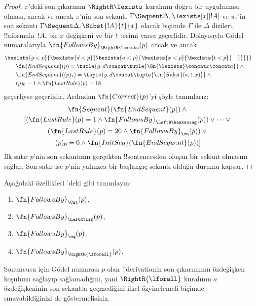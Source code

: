 \documentclass[../../../include/open-logic-section]{subfiles}
\begin{document}
\begin{proof}
$\pi$'deki son çıkarımın $\RightR\lexists$ kuralının doğru bir uygulaması
olması, ancak ve ancak $\pi$'nin son sekantı
$\Gamma \Sequent \Delta, \lexists[x][!A]$ ve $\pi_1$'in son sekantı
$\Gamma \Sequent \Delta, \Subst{!A}{t}{x}$ olacak biçimde $\Gamma$ ile
$\Delta$ dizileri, !!a{formula}~$!A$, bir $x$ değişkeni ve bir $t$ terimi
varsa geçerlidir. Dolayısıyla Gödel numaralarıyla
$\fn{FollowsBy}_{\RightR\lexists}(p)$ ancak ve ancak
\begin{align*}
  & \bexists{g<p}{\bexists{d<p}{\bexists{a<p}{\bexists{x<p}{\bexists{t<p}{\quad}}}}}\\
  & \qquad \fn{EndSequent}(p) =
  \tuple{
    g,
    d \concat \tuple{\Gn{\lexists} \concat x \concat a}
  } \land {}\\
  & \qquad \fn{EndSequent}((p)_1) =
  \tuple{
    g,
    d \concat \tuple{\fn{Subst}(a, t, x)}
  } \land {}\\
  & \qquad (p)_0 = 1 \land \fn{LastRule}(p) = 18
\end{align*}
geçerliyse geçerlidir. Ardından $\fn{Correct}(p)$'yi şöyle tanımlarız:
\begin{multline*}
  \fn{Sequent}(\fn{EndSequent}(p)) \land {}\\
  [(\fn{LastRule}(p) = 1 \land
  \fn{FollowsBy}_{\LeftR\Weakening}(p)) \lor \dots \lor {}\\
  (\fn{LastRule}(p) = 20 \land \fn{FollowsBy}_{\eq}(p)) \lor {}\\
  (p)_0 = 0 \land \fn{InitSeq}(\fn{EndSequent}(p))]
\end{multline*}
İlk satır $p$'nin son sekantının gerçekten !!{sentence}s{}den oluşan bir
sekant olmasını sağlar. Son satır ise $p$'nin yalnızca bir başlangıç sekantı
olduğu durumu kapsar.
\end{proof}

\begin{prob}
  Aşağıdaki özellikleri 'deki gibi
  tanımlayın:
  \begin{enumerate}
  \item $\fn{FollowsBy}_{\Cut}(p)$,
  \item $\fn{FollowsBy}_{\LeftR\lif}(p)$,
  \item $\fn{FollowsBy}_{\eq}(p)$,
  \item $\fn{FollowsBy}_{\RightR{\lforall}}(p)$.
  \end{enumerate}
  Sonuncusu için Gödel numarası $p$ olan !!{derivation}{}in son çıkarımının
  özdeğişken koşulunu sağlayıp sağlamadığını, yani
  $\RightR{\lforall}$ kuralının $a$ özdeğişkeninin son sekantta geçmediğini
  ilkel özyinelemeli biçimde sınayabildiğinizi de göstermelisiniz.
\end{prob}
\end{document}
